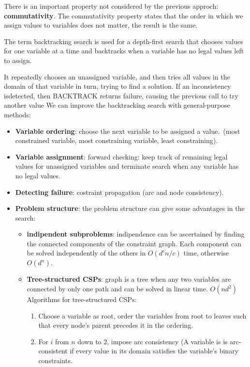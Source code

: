 \documentclass[12pt]{article}
\begin{document}
\begin{enumerate}
    There is an important property not considered by the previous approch: \textbf{commutativity}.
    The commutativity property states that the order in which we assign values to variables does not matter, the result is the same.
    
    The term backtracking search is used for a depth-first search that chooses values for one variable at a time and backtracks when a variable has no legal values left to assign.

    It repeatedly chooses an unassigned variable, and then tries all values in the domain of that variable in turn, trying to find a solution. 
    If an inconsistency isdetected, then BACKTRACK returns failure, causing the previous call to try another value
    We can improve the backtracking search with general-purpose methods:
    \begin{itemize}
        \item \textbf{Variable ordering}: choose the next variable to be assigned a value.\ (most constrained variable, most constraining variable, least constraining).
        \item \textbf{Variable assignment}: forward checking: keep track of remaining legal values for unassigned variables and terminate search when any variable has no legal values.
        \item \textbf{Detecting failure}: costraint propagation (arc and node consistency). 
        \item \textbf{Problem structure}: the problem structure can give some advantages in the search:
        \begin{itemize}
            \item \textbf{indipendent subproblems}: indipendence can be ascertained by finding the connected components of the constraint graph.
            Each component can be solved independently of the others in $O(d^cn/c)$ time, otherwise $O(d^n)$.
            \item \textbf{Tree-structured CSPs}: graph is a tree when any two variables are connected by only one path and can be solved in linear time. $O(nd^2)$
            Algorithms for tree-structured CSPs:
            \begin{enumerate}
                \item Choose a variable as root, order the variables from root to leaves such that every node's parent precedes it in the ordering.
                \item For $i$ from $n$ down to $2$, impose arc consistency (A variable is is arc-consistent if every value in its domain satisfies the variable's binary constraints. 

\end{enumerate}
\end{itemize}
\end{itemize}
\end{enumerate}
\end{document}

